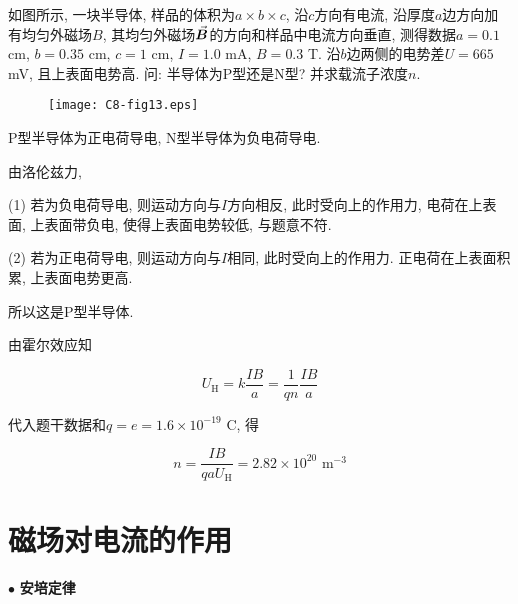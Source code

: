 \begin{example}
	如图所示, 一块半导体, 样品的体积为$a \times b \times c$, 沿$c$方向有电流, 沿厚度$a$边方向加有均匀外磁场$B$, 其均匀外磁场$\va*{B}$的方向和样品中电流方向垂直, 测得数据$a = 0.1$ cm, $b = 0.35$ cm, $c = 1$ cm, $I = 1.0$ mA, $B = 0.3$ T. 沿$b$边两侧的电势差$U = 665$ mV, 且上表面电势高. 问: 半导体为P型还是N型? 并求载流子浓度$n$.
	
	\begin{figure}[H]
		\centering
		\texttt{[image: C8-fig13.eps]}
	\end{figure}
	
	\begin{solution}
		
		P型半导体为正电荷导电, N型半导体为负电荷导电. 
		
		由洛伦兹力, 
		
		(1) 若为负电荷导电, 则运动方向与$I$方向相反, 此时受向上的作用力, 电荷在上表面, 上表面带负电, 使得上表面电势较低, 与题意不符. 
		
		(2) 若为正电荷导电, 则运动方向与$I$相同, 此时受向上的作用力. 正电荷在上表面积累, 上表面电势更高. 
		
		所以这是P型半导体. 
		
		由霍尔效应知
		
		\begin{equation*}
			U_{\textrm{H}} = k \dfrac{IB}{a} = \dfrac{1}{qn} \dfrac{IB}{a}
		\end{equation*}
		
		代入题干数据和$q = e = 1.6 \times 10^{-19}$ C, 得
		
		\begin{equation*}
			n = \dfrac{IB}{q a U_{\textrm{H}}} = 2.82 \times 10^{20} \textrm{~m}^{-3}
		\end{equation*}
		
	\end{solution}
	
\end{example}

\section{磁场对电流的作用}\label{8.5}

$\bullet$ \textbf{安培定律}

